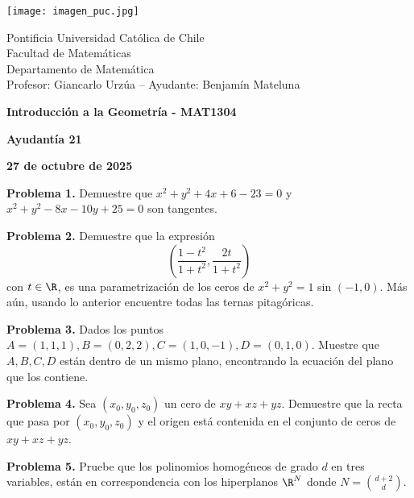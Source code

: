 \documentclass{article}
\begin{document}
\begin{minipage}{2.5cm}
    \texttt{[image: imagen\_puc.jpg]}
\end{minipage}
\begin{minipage}{14cm}
    {\sc Pontificia Universidad Católica de Chile\\
    Facultad de Matemáticas\\
    Departamento de Matemática\\
    Profesor: Giancarlo Urzúa -- Ayudante: Benjamín Mateluna}
\end{minipage}
\vspace{1ex}

{\centerline{\bf Introducción a la Geometría - MAT1304}
\centerline{\bf Ayudantía 21}}
\centerline{\bf 27 de octubre de 2025}

\vspace{1cm}
\noindent\textbf{Problema 1.} Demuestre que $x^{2}+y^{2}+4x+6-23=0$ y $x^{2}+y^{2}-8x-10y+25=0$
son tangentes.

\vspace{5mm}
\noindent\textbf{Problema 2.} Demuestre que la expresión
\begin{equation*}
    \left(\frac{1-t^{2}}{1+t^{2}},\frac{2t}{1+t^{2}}\right)
\end{equation*}
con $t\in\R$, es una parametrización de los ceros de $x^{2}+y^{2}=1$ sin $(-1,0)$. Más aún, usando
lo anterior encuentre todas las ternas pitagóricas.

\vspace{5mm}
\noindent\textbf{Problema 3.} Dados los puntos $A=(1,1,1),B=(0,2,2),C=(1,0,-1),D=(0,1,0)$. Muestre
que $A,B,C,D$ están dentro de un mismo plano, encontrando la ecuación del plano que los contiene.

\vspace{5mm}
\noindent\textbf{Problema 4.} Sea $(x_{0},y_{0},z_{0})$ un cero de $xy+xz+yz$. Demuestre que la 
recta que pasa por $(x_{0},y_{0},z_{0})$ y el origen está contenida en el conjunto de ceros de 
$xy+xz+yz$.

\vspace{5mm}
\noindent\textbf{Problema 5.} Pruebe que los polinomios homogéneos de grado $d$ en tres variables, 
están en correspondencia con los hiperplanos $\R^{N}$ donde $N=\binom{d+2}{d}$.

\end{document}
